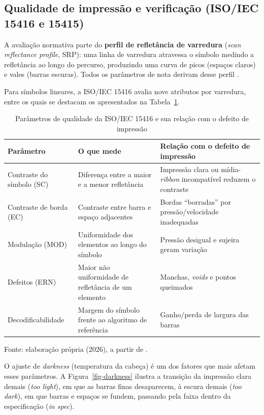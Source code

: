 \documentclass[
	article,			%
	11pt,				%
	oneside,			%
	a4paper,			%
	english,			%
	brazilian,			%
	sumario=tradicional
	]{abntex2}
\begin{document}
\subsection{Qualidade de impressão e verificação (ISO/IEC 15416 e 15415)}
\label{sec-qualidade}

A avaliação normativa parte do \textbf{perfil de refletância de varredura}
(\textit{scan reflectance profile}, SRP): uma linha de varredura atravessa o
símbolo medindo a refletância ao longo do percurso, produzindo uma curva de picos
(espaços claros) e vales (barras escuras). Todos os parâmetros de nota derivam
desse perfil \cite{iso15416}.

Para símbolos lineares, a ISO/IEC 15416 avalia nove atributos por varredura, entre
os quais se destacam os apresentados na Tabela~\ref{tab-iso}.

\begin{table}[htb]
\centering
\caption{Parâmetros de qualidade da ISO/IEC 15416 e sua relação com o defeito de
impressão}
\label{tab-iso}
\begin{tabular}{@{}p{3.4cm}p{4.6cm}p{5.2cm}@{}}
\toprule
\textbf{Parâmetro} & \textbf{O que mede} & \textbf{Relação com o defeito de impressão}\\
\midrule
Contraste do símbolo (SC) & Diferença entre a maior e a menor refletância &
Impressão clara ou mídia-\textit{ribbon} incompatível reduzem o contraste\\
Contraste de borda (EC) & Contraste entre barra e espaço adjacentes &
Bordas ``borradas'' por pressão/velocidade inadequadas\\
Modulação (MOD) & Uniformidade dos elementos ao longo do símbolo &
Pressão desigual e sujeira geram variação\\
Defeitos (ERN) & Maior não uniformidade de refletância de um elemento &
Manchas, \textit{voids} e pontos queimados\\
Decodificabilidade & Margem do símbolo frente ao algoritmo de referência &
Ganho/perda de largura das barras\\
\bottomrule
\end{tabular}

\vspace{2pt}
{\footnotesize Fonte: elaboração própria (2026), a partir de .}
\end{table}

O ajuste de \textit{darkness} (temperatura da cabeça) é um dos fatores que mais
afetam esses parâmetros. A Figura~\ref{fig-darkness} ilustra a transição da
impressão clara demais (\textit{too light}), em que as barras finas desaparecem, à
escura demais (\textit{too dark}), em que barras e espaços se fundem, passando pela
faixa dentro da especificação (\textit{in spec}).
\end{document}
